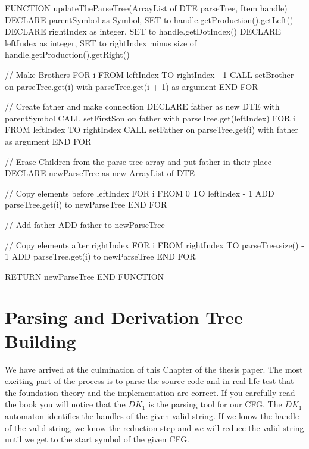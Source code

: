 \begin{codeblock}
    FUNCTION updateTheParseTree(ArrayList of DTE parseTree, Item handle)
    DECLARE parentSymbol as Symbol, SET to handle.getProduction().getLeft()
    DECLARE rightIndex as integer, SET to handle.getDotIndex()
    DECLARE leftIndex as integer, SET to rightIndex minus size of handle.getProduction().getRight()

    // Make Brothers
    FOR i FROM leftIndex TO rightIndex - 1
    CALL setBrother on parseTree.get(i) with parseTree.get(i + 1) as argument
    END FOR

    // Create father and make connection
    DECLARE father as new DTE with parentSymbol
    CALL setFirstSon on father with parseTree.get(leftIndex)
    FOR i FROM leftIndex TO rightIndex
    CALL setFather on parseTree.get(i) with father as argument
    END FOR

    // Erase Children from the parse tree array and put father in their place
    DECLARE newParseTree as new ArrayList of DTE

    // Copy elements before leftIndex
    FOR i FROM 0 TO leftIndex - 1
    ADD parseTree.get(i) to newParseTree
    END FOR

    // Add father
    ADD father to newParseTree

    // Copy elements after rightIndex
    FOR i FROM rightIndex TO parseTree.size() - 1
    ADD parseTree.get(i) to newParseTree
    END FOR

    RETURN newParseTree
    END FUNCTION

\end{codeblock}

\newpage


\section{Parsing and Derivation Tree Building}\label{sec:Parsing and Derivation Tree Building}

We have arrived at the culmination of this Chapter of the thesis paper. The most exciting part of the process is to parse the source code and in real life test that the foundation theory and the implementation are correct. If you carefully read the book you will notice that the \(DK_{1}\) is the parsing tool for our CFG. The \(DK_{1}\) automaton identifies the handles of the given valid string. If we know the handle of the valid string, we know the reduction step and we will reduce the valid string until we get to the start symbol of the given CFG.\\

